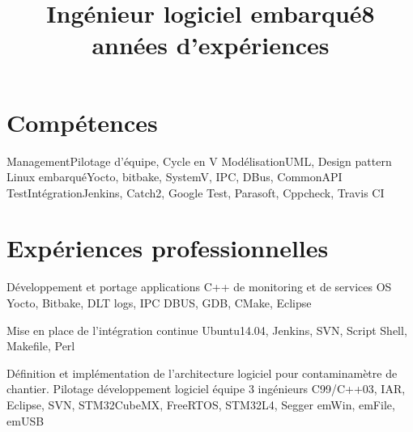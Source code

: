 \documentclass[10pt, a4paper, sans]{moderncv}
\title{Ingénieur logiciel embarqué\newline \large 8 années d'expériences}
\begin{document}
\makecvtitle

\section{Compétences}

	{Management}{Pilotage d'équipe, Cycle en V}
	{Modélisation}{UML, Design pattern}
	{Linux embarqué}{Yocto, bitbake, SystemV, IPC, DBus, CommonAPI}
	{Test\newline Intégration}{Jenkins, Catch2, Google Test, Parasoft, Cppcheck, Travis CI}

\section{Expériences professionnelles}


	{Développement et portage applications C++ de monitoring et de services OS}
	{Yocto, Bitbake, DLT logs, IPC DBUS, GDB, CMake, Eclipse}
	
	{Mise en place de l’intégration continue}
	{Ubuntu14.04, Jenkins, SVN, Script Shell, Makefile, Perl}

	{Définition et implémentation de l’architecture logiciel pour contaminamètre de chantier. Pilotage développement logiciel équipe 3 ingénieurs}
	{C99/C++03, IAR, Eclipse, SVN, STM32CubeMX, FreeRTOS, STM32L4, Segger emWin, emFile, emUSB}
\end{document}

